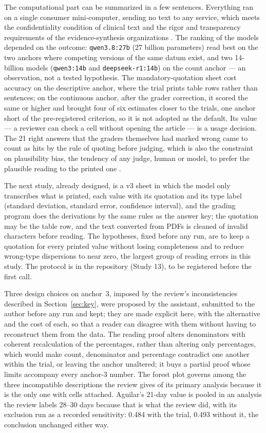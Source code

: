 \documentclass[11pt]{article}
\begin{document}
The computational part can be summarized in a few sentences. Everything ran on a single consumer mini-computer, sending no text to any service, which meets the confidentiality condition of clinical text and the rigor and transparency requirements of the evidence-synthesis organizations \citep{flemyng2025position}. The ranking of the models depended on the outcome: \texttt{qwen3.8:27b} (27 billion parameters) read best on the two anchors where competing versions of the same datum exist, and two 14-billion models (\texttt{qwen3:14b} and \texttt{deepseek-r1:14b}) on the count anchor --- an observation, not a tested hypothesis. The mandatory-quotation sheet cost accuracy on the descriptive anchor, where the trial prints table rows rather than sentences; on the continuous anchor, after the grader correction, it scored the same or higher and brought four of six estimates closer to the trials, one anchor short of the pre-registered criterion, so it is not adopted as the default. Its value --- a reviewer can check a cell without opening the article --- is a usage decision. The 21 right answers that the graders themselves had marked wrong came to count as hits by the rule of quoting before judging, which is also the constraint on plausibility bias, the tendency of any judge, human or model, to prefer the plausible reading to the printed one \citep{zheng2023judging}.

The next study, already designed, is a v3 sheet in which the model only transcribes what is printed, each value with its quotation and its type label (standard deviation, standard error, confidence interval), and the grading program does the derivations by the same rules as the answer key; the quotation may be the table row, and the text converted from PDFs is cleaned of invalid characters before reading. The hypotheses, fixed before any run, are to keep a quotation for every printed value without losing completeness and to reduce wrong-type dispersions to near zero, the largest group of reading errors in this study. The protocol is in the repository (Study 13), to be registered before the first call.

Three design choices on anchor~3, imposed by the review's inconsistencies described in Section~\ref{sec:key}, were proposed by the assistant, submitted to the author before any run and kept; they are made explicit here, with the alternative and the cost of each, so that a reader can disagree with them without having to reconstruct them from the data. The reading proof alters denominators with coherent recalculation of the percentages, rather than altering only percentages, which would make count, denominator and percentage contradict one another within the trial, or leaving the anchor unaltered; it buys a partial proof whose limits accompany every anchor-3 number. The forest plot governs among the three incompatible descriptions the review gives of its primary analysis because it is the only one with cells attached. Aguilar's 21-day value is pooled in an analysis the review labels 28--30 days because that is what the review did, with its exclusion run as a recorded sensitivity: 0.484 with the trial, 0.493 without it, the conclusion unchanged either way.
\end{document}

